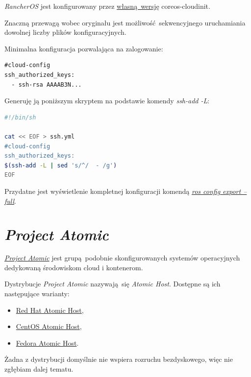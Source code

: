 \documentclass[a4paper,12pt,twoside,openany]{report}
\providecommand{\tightlist}{%
  \setlength{\itemsep}{0pt}\setlength{\parskip}{0pt}}
\begin{document}
\emph{RancherOS} jest konfigurowany przez
\protect\hyperlink{rancheros-+-coreos-cloudinit}{własną~wersję}
coreos-cloudinit.

Znaczną przewagą wobec oryginału jest możliwość~sekwencyjnego
uruchamiania dowolnej liczby plików konfiguracyjnych.

Minimalna konfiguracja pozwalająca na zalogowanie:

\begin{lstlisting}
#cloud-config
ssh_authorized_keys:
  - ssh-rsa AAAAB3N...
\end{lstlisting}

Generuję ją poniższym skryptem na podstawie komendy \emph{ssh-add -L}:

\begin{lstlisting}[language=bash]
#!/bin/sh

cat << EOF > ssh.yml
#cloud-config
ssh_authorized_keys:
$(ssh-add -L | sed 's/^/  - /g')
EOF
\end{lstlisting}

Przydatne jest wyświetlenie kompletnej konfiguracji komendą
\href{https://forums.rancher.com/t/good-cloud-config-reference/5238/3}{\emph{ros
config export --full}}.

\hypertarget{project-atomic}{%
\section{\texorpdfstring{\emph{Project
Atomic}}{Project Atomic}}\label{project-atomic}}

\href{https://www.projectatomic.io/}{\emph{Project Atomic}} jest
grupą~podobnie skonfigurowanych systemów operacyjnych dedykowaną
środowiskom cloud i kontenerom.

Dystrybucje \emph{Project Atomic} nazywają~się \emph{Atomic Host}.
Dostępne są ich następujące warianty:

\begin{itemize}
\tightlist
\item
  \href{https://www.redhat.com/en/resources/enterprise-linux-atomic-host-datasheet}{Red
  Hat Atomic Host},
\item
  \href{https://wiki.centos.org/SpecialInterestGroup/Atomic/Download/}{CentOS
  Atomic Host},
\item
  \href{https://getfedora.org/atomic/download/}{Fedora Atomic Host}.
\end{itemize}

Żadna z dystrybucji domyślnie nie wspiera rozruchu bezdyskowego, więc
nie zgłębiam dalej tematu.
\end{document}
